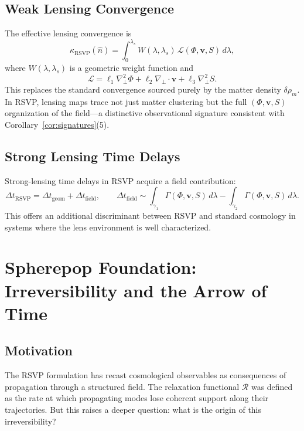 \documentclass[12pt,a4paper]{article}
\theoremstyle{remark}
\newcommand{\vv}{\mathbf{v}}
\newcommand{\Rcal}{\mathcal{R}}
\begin{document}
\subsection{Weak Lensing Convergence}

The effective lensing convergence is
\begin{equation}
\kappa_{\mathrm{RSVP}}(\hat{n}) = \int_0^{\lambda_s} W(\lambda, \lambda_s)\,\mathcal{L}(\Phi, \vv, S)\, d\lambda,
\end{equation}
where $W(\lambda, \lambda_s)$ is a geometric weight function and
\begin{equation}
\mathcal{L} = \ell_1 \nabla_\perp^2 \Phi + \ell_2 \nabla_\perp \cdot \vv + \ell_3 \nabla_\perp^2 S.
\end{equation}
This replaces the standard convergence sourced purely by the matter density $\delta\rho_m$. In RSVP, lensing maps trace not just matter clustering but the full $(\Phi, \vv, S)$ organization of the field---a distinctive observational signature consistent with Corollary~\ref{cor:signatures}(5).

\subsection{Strong Lensing Time Delays}

Strong-lensing time delays in RSVP acquire a field contribution:
\begin{equation}
\Delta t_{\mathrm{RSVP}} = \Delta t_{\mathrm{geom}} + \Delta t_{\mathrm{field}},
\qquad
\Delta t_{\mathrm{field}} \sim \int_{\gamma_1}\Gamma(\Phi,\vv,S)\, d\lambda - \int_{\gamma_2}\Gamma(\Phi,\vv,S)\, d\lambda.
\end{equation}
This offers an additional discriminant between RSVP and standard cosmology in systems where the lens environment is well characterized.

\section{Spherepop Foundation: Irreversibility and the Arrow of Time}
\label{sec:spherepop}

\subsection{Motivation}

The RSVP formulation has recast cosmological observables as consequences of propagation through a structured field. The relaxation functional $\Rcal$ was defined as the rate at which propagating modes lose coherent support along their trajectories. But this raises a deeper question: what is the origin of this irreversibility?
\end{document}
